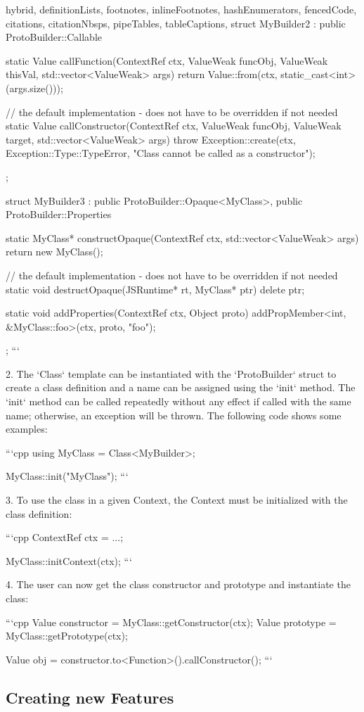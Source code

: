 \begin{markdown*}{%
  hybrid,
  definitionLists,
  footnotes,
  inlineFootnotes,
  hashEnumerators,
  fencedCode,
  citations,
  citationNbsps,
  pipeTables,
  tableCaptions,
}
struct MyBuilder2 : public ProtoBuilder::Callable {
    static Value callFunction(ContextRef ctx, ValueWeak funcObj, ValueWeak thisVal, std::vector<ValueWeak> args) {
        return Value::from(ctx, static_cast<int>(args.size()));
    }

    // the default implementation - does not have to be overridden if not needed
    static Value callConstructor(ContextRef ctx, ValueWeak funcObj, ValueWeak target, std::vector<ValueWeak> args) {
        throw Exception::create(ctx, Exception::Type::TypeError, "Class cannot be called as a constructor");
    }
};

struct MyBuilder3 : public ProtoBuilder::Opaque<MyClass>, public ProtoBuilder::Properties {
    static MyClass* constructOpaque(ContextRef ctx, std::vector<ValueWeak> args) {
        return new MyClass();
    }

    // the default implementation - does not have to be overridden if not needed
    static void destructOpaque(JSRuntime* rt, MyClass* ptr) {
        delete ptr;
    }

    static void addProperties(ContextRef ctx, Object proto) {
        addPropMember<int, &MyClass::foo>(ctx, proto, "foo");
    }
};
```

  2. The `Class` template can be instantiated with the `ProtoBuilder` struct to create a class definition and a name can be assigned using the `init` method. The `init` method can be called repeatedly without any effect if called with the same name; otherwise, an exception will be thrown. The following code shows some examples:

```cpp
using MyClass = Class<MyBuilder>;

MyClass::init("MyClass");
```

  3. To use the class in a given Context, the Context must be initialized with the class definition:

```cpp
ContextRef ctx = ...;

MyClass::initContext(ctx);
```

  4. The user can now get the class constructor and prototype and instantiate the class:

```cpp
Value constructor = MyClass::getConstructor(ctx);
Value prototype = MyClass::getPrototype(ctx);

Value obj = constructor.to<Function>().callConstructor();
```

\subsection{Creating new Features}


\end{markdown*}
